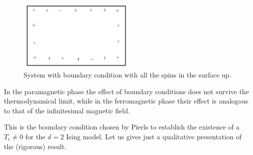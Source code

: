 \documentclass[../main/main.tex]{subfiles}
\begin{document}
\begin{figure}[h!]
\centering
\includegraphics[width=0.5\textwidth]{../lessons/10_image/1.pdf}
\caption{\label{fig:10_1} System with boundary condition with all the spins in the surface up.}
\end{figure}

In the paramagnetic phase the effect of boundary conditions does not survive the thermodynamical limit, while in the ferromagnetic phase their effect is analogous to that of the infinitesimal magnetic field.

This is the boundary condition chosen by Pierls to establish the existence of a \( T_c \neq 0 \) for the \(d=2\) Ising model.
Let us gives just a qualitative presentation  of the (rigorous) result. 
\end{document}
